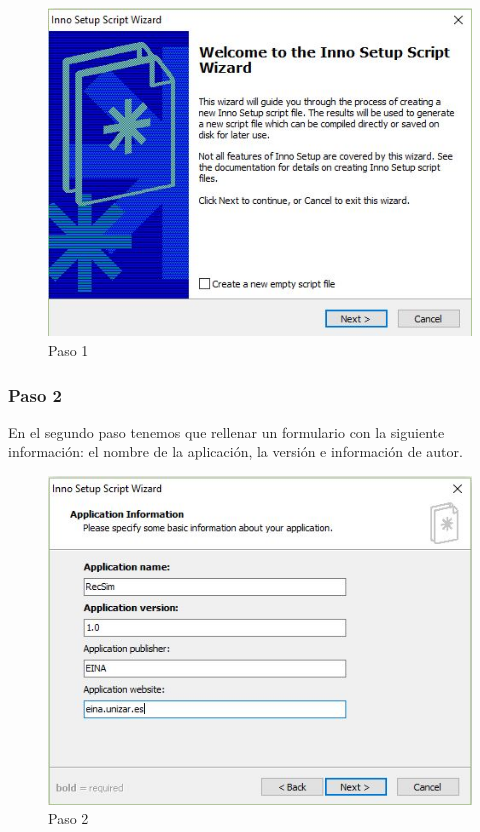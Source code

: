 \begin{figure}[H]
	\centering\includegraphics[scale=0.5]{imagenes/implementacion/1.jpg}
	\caption{Paso 1}
	\label{instaladorPaso1}
\end{figure}

\subsubsection{Paso 2}

En el segundo paso tenemos que rellenar un formulario con la siguiente información: el nombre de la aplicación, la versión e información de autor. 

\begin{figure}[H]
	\centering\includegraphics[scale=0.5]{imagenes/implementacion/2.jpg}
	\caption{Paso 2}
	\label{instaladorPaso2}
\end{figure}

